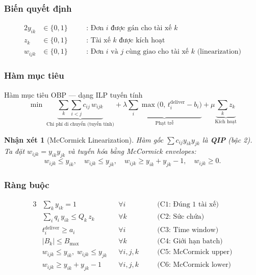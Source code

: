 \documentclass[12pt,a4paper]{article}
\newtheorem{remark}{Nhận xét}[section]
\begin{document}
\subsubsection{Biến quyết định}

\begin{alignat}{2}
  y_{ik} &\in \{0,1\} \quad&&\text{: Đơn $i$ được gán cho tài xế $k$}\\
  z_k    &\in \{0,1\} \quad&&\text{: Tài xế $k$ được kích hoạt}\\
  w_{ijk}&\in \{0,1\} \quad&&\text{: Đơn $i$ và $j$ cùng giao cho tài xế $k$ (linearization)}
\end{alignat}

\subsubsection{Hàm mục tiêu}

\begin{formulabox}{Hàm mục tiêu OBP --- dạng ILP tuyến tính}
\begin{equation}
  \min \;
  \underbrace{\sum_{k}\sum_{i<j} c_{ij}\,w_{ijk}}_{\text{Chi phí di chuyển (tuyến tính)}}
  + \lambda\underbrace{\sum_i \max\!\bigl(0,\,t_i^{\text{deliver}} - b_i\bigr)}_{\text{Phạt trễ}}
  + \mu\underbrace{\sum_k z_k}_{\text{Kích hoạt}}
\end{equation}
\end{formulabox}

\begin{remark}[McCormick Linearization]
Hàm gốc $\sum c_{ij}y_{ik}y_{jk}$ là \textbf{QIP} (bậc 2). Ta đặt
$w_{ijk} = y_{ik}y_{jk}$ và tuyến hóa bằng \emph{McCormick envelopes}:
\begin{equation}
  w_{ijk} \leq y_{ik},\quad w_{ijk} \leq y_{jk},\quad
  w_{ijk} \geq y_{ik} + y_{jk} - 1,\quad w_{ijk} \geq 0.
\end{equation}
\end{remark}

\subsubsection{Ràng buộc}

\begin{alignat}{3}
  &\sum_k y_{ik} = 1 &&\forall i &&\quad\text{(C1: Đúng 1 tài xế)}\\
  &\sum_i q_i\,y_{ik} \leq Q_k\,z_k &&\forall k &&\quad\text{(C2: Sức chứa)}\\
  &t_i^{\text{deliver}} \geq a_i &&\forall i &&\quad\text{(C3: Time window)}\\
  &|B_k| \leq B_{\max} &&\forall k &&\quad\text{(C4: Giới hạn batch)}\\
  &w_{ijk} \leq y_{ik},\; w_{ijk} \leq y_{jk} &&\forall i,j,k &&\quad\text{(C5: McCormick upper)}\\
  &w_{ijk} \geq y_{ik}+y_{jk}-1 &&\forall i,j,k &&\quad\text{(C6: McCormick lower)}
\end{alignat}
\end{document}
